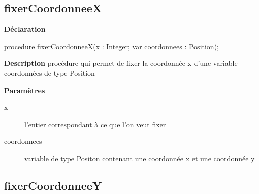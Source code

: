 \documentclass{report}
\newif\ifpdf
\begin{document}
\subsection*{fixerCoordonneeX}
\fi
\label{Types-fixerCoordonneeX}
\begin{list}{}{
\setlength{\itemindent}{0cm}
\setlength{\listparindent}{0cm}
\setlength{\leftmargin}{\evensidemargin}
\addtolength{\leftmargin}{\tmplength}
\settowidth{\labelsep}{X}
\addtolength{\leftmargin}{\labelsep}
\setlength{\labelwidth}{\tmplength}
}
\item[\textbf{Déclaration}\hfill]
\ifpdf
\begin{flushleft}
\fi
\begin{ttfamily}
procedure fixerCoordonneeX(x : Integer; var coordonnees : Position);\end{ttfamily}

\ifpdf
\end{flushleft}
\fi

\par
\item[\textbf{Description}]
procédure qui permet de fixer la coordonnée x d'une variable coordonnées de type Position  \par
\item[\textbf{Paramètres}]
\begin{description}
\item[x] l'entier correspondant à ce que l'on veut fixer
\item[coordonnees] variable de type Positon contenant une coordonnée x et une coordonnée y
\end{description}


\end{list}
\ifpdf
\subsection*{\large{\textbf{fixerCoordonneeY}}\normalsize\hspace{1ex}\hrulefill}
\else
\end{document}
